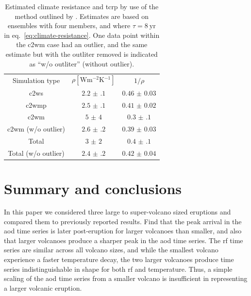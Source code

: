 \documentclass{ametsocV6.1}
\begin{document}
\begin{table}
  \centering

  \caption{Estimated climate resistance and \gls{tcrp} by use of the method outlined by
    \citet{merlis2014}. Estimates are based on ensembles with four members, and where \(\tau
    =\SI{8}{\mathrm{yr}}\) in eq.~\ref{eq:climate-resistance}. One data point within the
    \gls{c2wm} case had an outlier, and the same estimate but with the outliter removed is
    indicated as ``w/o outliter'' (without outlier).}\label{tab:trcp}%
  \begin{tabular}{ccc}
    Simulation type          & \(\rho [\si{\watt\metre^{-2}\kelvin^{-1}}]\) & \(1/\rho\)        \\
    \gls{c2ws}               & \(\num{2.2(1)}\)                             & \(\num{0.46(3)}\) \\
    \gls{c2wmp}              & \(\num{2.5(1)}\)                             & \(\num{0.41(2)}\) \\
    \gls{c2wm}               & \(\num{5(4)}\)                               & \(\num{0.3(1)}\)  \\
    \gls{c2wm} (w/o outlier) & \(\num{2.6(2)}\)                             & \(\num{0.39(3)}\) \\
    Total                    & \(\num{3(2)}\)                               & \(\num{0.4(1)}\)  \\
    Total (w/o outlier)      & \(\num{2.4(2)}\)                             & \(\num{0.42(4)}\) \\
  \end{tabular}
\end{table}


\section{Summary and conclusions}\label{sec:conclusions}

In this paper we considered three large to super-volcano sized eruptions and compared
them to previously reported results. Find that the peak arrival in the \gls{aod} time
series is later post-eruption for larger volcanoes than smaller, and also that larger
volcanoes produce a sharper peak in the \gls{aod} time series. The \gls{rf} time series
are similar across all volcano sizes, and while the smallest volcano experience a faster
temperature decay, the two larger volcanoes produce time series indistinguishable in
shape for both \gls{rf} and temperature. Thus, a simple scaling of the \gls{aod} time
series from a smaller volcano is insufficient in representing a larger volcanic
eruption.
\end{document}

